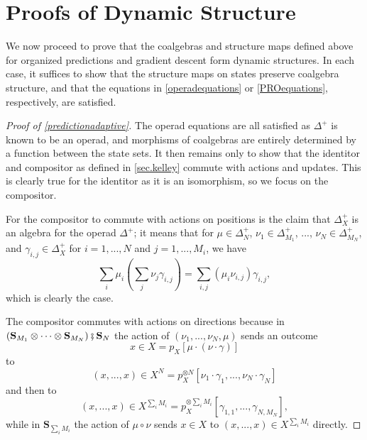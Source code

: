 \documentclass{eptcs}
\theoremstyle{definition}
\theoremstyle{plain}
\newcommand{\Cat}[1]{\textbf{#1}}%
\newcommand{\then}{\mathbin{\fatsemi}}
\newcommand{\0}{\textsf{0}}
\newcommand{\1}{\tn{\textsf{1}}}
\renewcommand{\S}{{\Cat{S}}}
\begin{document}
\section{Proofs of Dynamic Structure}\label{proofs}


We now proceed to prove that the coalgebras and structure maps defined above for organized predictions and gradient descent form dynamic structures. In each case, it suffices to show that the structure maps on states preserve coalgebra structure, and that the equations in \cref{operadequations} or \cref{PROequations}, respectively, are satisfied.

\begin{proof}[Proof of \cref{predictionadaptive}]
The operad equations are all satisfied as $\Delta^+$ is known to be an operad, and morphisms of coalgebras are entirely determined by a function between the state sets. It then remains only to show that the identitor and compositor as defined in \cref{sec.kelley} commute with actions and updates. This is clearly true for the identitor as it is an isomorphism, so we focus on the compositor.

For the compositor to commute with actions on positions is the claim that $\Delta^+_X$ is an algebra for the operad $\Delta^+$; it means that for $\mu \in \Delta^+_N$, $\nu_1 \in \Delta^+_{M_1}$, ..., $\nu_N \in \Delta^+_{M_N}$, and $\gamma_{i,j} \in \Delta^+_X$ for $i=1,...,N$ and $j=1,...,M_i$, we have
\[
\sum_i \mu_i \left(\sum_j \nu_j \gamma_{i,j}\right) = \sum_{i,j} (\mu_i \nu_{i,j})\gamma_{i,j},
\]
which is clearly the case.

The compositor commutes with actions on directions because in $(\S_{M_1} \otimes \cdots \otimes \S_{M_N}) \then \S_N$ the action of $(\nu_1,...,\nu_N,\mu)$ sends an outcome 
\[
x \in X = p_X[\mu \cdot (\nu \cdot \gamma)]
\]
to 
\[
(x,...,x) \in X^N = p_X^{\otimes N}[\nu_1 \cdot \gamma_1,...,\nu_N \cdot \gamma_N]
\]
and then to 
\[
(x,...,x) \in X^{\sum_i M_i} = p_X^{\otimes \sum_i M_i}[\gamma_{1,1},...,\gamma_{N,M_N}],
\]
while in $\S_{\sum_i M_i}$ the action of $\mu \circ \nu$ sends $x \in X$ to $(x,...,x) \in X^{\sum_i M_i}$ directly.


\end{proof}
\end{document}
